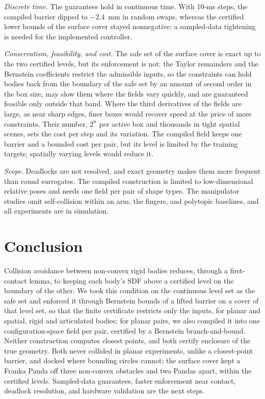 \documentclass[journal]{IEEEtran}
\theoremstyle{definition}
\begin{document}
\emph{Discrete time.} The guarantees hold in continuous time. With 10-ms steps, the compiled barrier
dipped to $-2.4$~mm in random swaps, whereas the certified lower bounds of the surface cover stayed
nonnegative; a sampled-data tightening is needed for the implemented controller.

\emph{Conservatism, feasibility, and cost.} The safe set of the surface cover is exact up to the two
certified levels, but its enforcement is not: the Taylor remainders and the Bernstein coefficients
restrict the admissible inputs, so the constraints can hold bodies back from the boundary of the safe
set by an amount of second order in the box size, may slow them where the fields vary quickly, and are
guaranteed feasible only outside that band. Where the third derivatives of the fields are large, as
near sharp edges, finer boxes would recover speed at the price of more constraints. Their number,
$2^n$ per active box and thousands in tight spatial scenes, sets the cost per step and its
variation. The compiled field keeps one barrier and a bounded cost per pair, but its level is
limited by the training targets; spatially varying levels would reduce it.

\emph{Scope.} Deadlocks are not resolved, and exact geometry makes them more frequent than round
surrogates. The compiled construction is limited to low-dimensional relative poses and needs one
field per pair of shape types. The manipulator studies omit self-collision within an arm, the
fingers, and polytopic baselines, and all experiments are in simulation.

\section{Conclusion}\label{sec:concl}
Collision avoidance between non-convex rigid bodies reduces, through a first-contact lemma, to
keeping each body's SDF above a certified level on the boundary of the other. We took this condition
on the continuous level set as the safe set and enforced it through Bernstein bounds of a lifted
barrier on a cover of that level set, so that the finite certificate restricts only the inputs, for
planar and spatial, rigid and articulated bodies; for planar pairs, we also compiled it into one
configuration-space field per pair, certified by a Bernstein branch-and-bound. Neither construction
computes closest points, and both certify enclosure of the true geometry. Both never collided in
planar experiments, unlike a closest-point barrier, and docked where bounding circles cannot; the
surface cover kept a Franka Panda off three non-convex obstacles and two Pandas apart, within the
certified levels. Sampled-data guarantees, faster enforcement near contact, deadlock resolution, and
hardware validation are the next steps.



\end{document}
